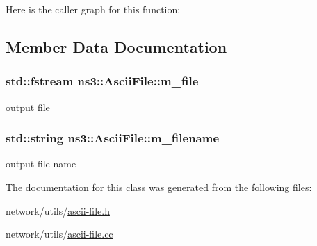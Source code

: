 Here is the caller graph for this function\+:




\subsection{Member Data Documentation}
\subsubsection[{\texorpdfstring{m\+\_\+file}{m_file}}]{\setlength{\rightskip}{0pt plus 5cm}std\+::fstream ns3\+::\+Ascii\+File\+::m\+\_\+file\hspace{0.3cm}{\ttfamily [private]}}\hypertarget{classns3_1_1AsciiFile_a9cfd48413c01b0b4b367d3fdda6aee42}{}\label{classns3_1_1AsciiFile_a9cfd48413c01b0b4b367d3fdda6aee42}


output file 

\subsubsection[{\texorpdfstring{m\+\_\+filename}{m_filename}}]{\setlength{\rightskip}{0pt plus 5cm}std\+::string ns3\+::\+Ascii\+File\+::m\+\_\+filename\hspace{0.3cm}{\ttfamily [private]}}\hypertarget{classns3_1_1AsciiFile_aafa564bec9ff792112d7145d715d3934}{}\label{classns3_1_1AsciiFile_aafa564bec9ff792112d7145d715d3934}


output file name 



The documentation for this class was generated from the following files\+:\begin{DoxyCompactItemize}
\item 
network/utils/\hyperlink{ascii-file_8h}{ascii-\/file.\+h}\item 
network/utils/\hyperlink{ascii-file_8cc}{ascii-\/file.\+cc}\end{DoxyCompactItemize}
